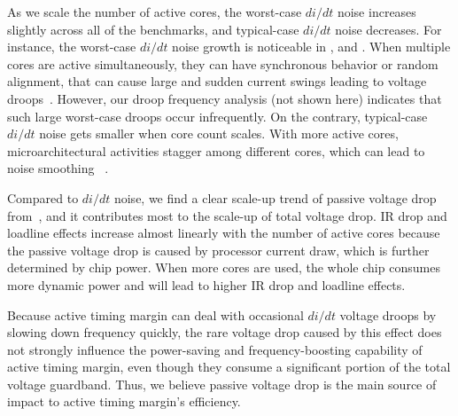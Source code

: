 As we scale the number of active cores, the worst-case $di/dt$ noise increases slightly across all of the benchmarks, and typical-case $di/dt$ noise decreases. For instance, the worst-case $di/dt$ noise growth is noticeable in ,  and . When multiple cores are active simultaneously, they can have synchronous behavior or random alignment, that can cause large and sudden current swings leading to voltage droops~\cite{reddi2010voltage,miller2012vrsync,kim2012audit}. However, our droop frequency analysis (not shown here) indicates that such large worst-case droops occur infrequently. On the contrary, typical-case $di/dt$ noise gets smaller when core count scales. With more active cores, microarchitectural activities stagger among different cores, which can lead to noise smoothing ~\cite{miller2012vrsync,reddi2010voltage}.

Compared to $di/dt$ noise, we find a clear scale-up trend of passive voltage drop from~, and it contributes most to the scale-up of total voltage drop. IR drop and loadline effects increase almost linearly with the number of active cores because the passive voltage drop is caused by processor current draw, which is further determined by chip power. When more cores are used, the whole chip consumes more dynamic power and will lead to higher IR drop and loadline effects.

Because active timing margin can deal with occasional $di/dt$ voltage droops by slowing down frequency quickly, the rare voltage drop caused by this effect does not strongly influence the power-saving and frequency-boosting capability of active timing margin, even though they consume a significant portion of the total voltage guardband. Thus, we believe passive voltage drop is the main source of impact to active timing margin's efficiency. 

